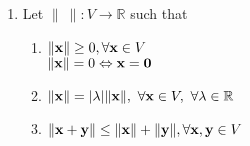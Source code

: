 \documentclass{article}
\author{Dzmitry Lazerka}
\begin{document}
\begin{enumerate}
\item

Let $\|\ \| : V \rightarrow {\mathbb R}$ such that
\begin{enumerate}
\item
$\|{\bf x}\| \geq 0, \forall {\bf x} \in V$\\
$\|{\bf x}\| = 0 \Leftrightarrow {\bf x} = {\bf 0}$
\item
$\|{\bf x}\| = |\lambda|\|{\bf x}\|,\ \forall {\bf x} \in V,\
\forall \lambda \in \mathbb{R}$
\item
$\|{\bf x} + {\bf y}\| \leq \|{\bf x}\| + \|{\bf y}\|, \forall {\bf
x}, {\bf y} \in V$
\end{enumerate}

\end{enumerate}
\end{document}
